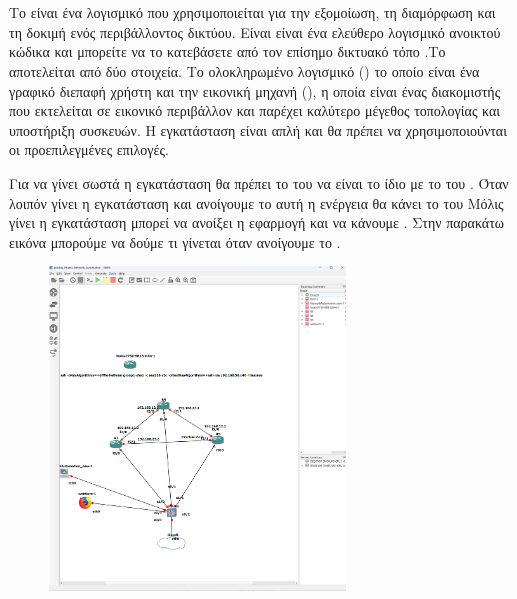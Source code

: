 \chapter{}

\section{}

Το  είναι ένα λογισμικό που χρησιμοποιείται για την εξομοίωση, τη διαμόρφωση και τη δοκιμή ενός περιβάλλοντος δικτύου. Είναι
είναι ένα ελεύθερο λογισμικό ανοικτού κώδικα και μπορείτε να το κατεβάσετε από τον επίσημο δικτυακό τόπο 
 .Το  αποτελείται από δύο στοιχεία. Το ολοκληρωμένο λογισμικό () το οποίο είναι ένα γραφικό 
διεπαφή χρήστη και την εικονική μηχανή (), η οποία είναι ένας διακομιστής που εκτελείται σε εικονικό περιβάλλον και παρέχει καλύτερο μέγεθος τοπολογίας και υποστήριξη συσκευών.
Η εγκατάσταση είναι απλή και θα πρέπει να χρησιμοποιούνται οι προεπιλεγμένες επιλογές.

Για να γίνει σωστά η εγκατάσταση θα πρέπει το  του  να είναι το ίδιο με το
 του . Όταν λοιπόν γίνει η εγκατάσταση και ανοίγουμε το 
αυτή η ενέργεια θα κάνει  το  του 
Μόλις γίνει η εγκατάσταση μπορεί να ανοίξει η εφαρμογή και να κάνουμε . Στην παρακάτω
εικόνα μπορούμε να δούμε τι γίνεται όταν ανοίγουμε το . 

\begin{figure}[htb]
	\centering
	\includegraphics[width=0.7\textwidth]{graphics/gns3_homepage.png}
	\caption{ }
\end{figure}

